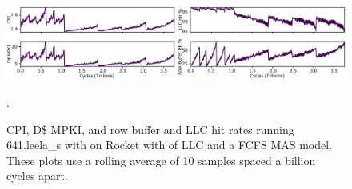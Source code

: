 \begin{figure}
    \vspace{-0.15in}
    \centering
    \includegraphics[width=\textwidth]{figures/leela-time-series.pdf}
    \vspace{-0.30in}
    \caption{CPI, D\$ MPKI, and row buffer and LLC hit rates running
    641.leela\_s with on Rocket with  of LLC and a FCFS MAS
    model. These plots use a rolling average of 10 samples spaced a billion
    cycles apart.}.
    \label{fig:leela-time-series}
\vspace{-0.25in}
\end{figure}

